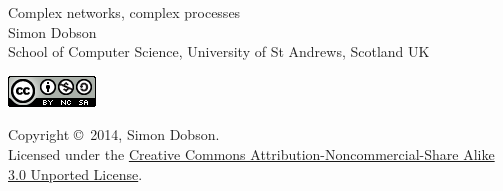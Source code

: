 
\begin{titlepage}
  \Huge{Complex networks, complex processes}
  \\[1cm]
  \large{Simon Dobson \\ %
    School of Computer Science, University of St Andrews, Scotland UK}

  \vfill
  \begin{minipage}{1.0\linewidth}
    \parbox{0.2\linewidth}{%
      \includegraphics{cc-at-nc-sa.png}
    } %
    \hfill
    \parbox{0.7\linewidth}{%
      Copyright \copyright~2014, Simon Dobson.
      \\[0.5cm]
      Licensed under the
      \href{http://creativecommons.org/licenses/by-nc-sa/3.0}{Creative Commons Attribution-Noncommercial-Share Alike 3.0 Unported License}.
      \\[0.5cm]
      
    }
  \end{minipage}
\end{titlepage}

\newpage



\tableofcontents
\newpage




